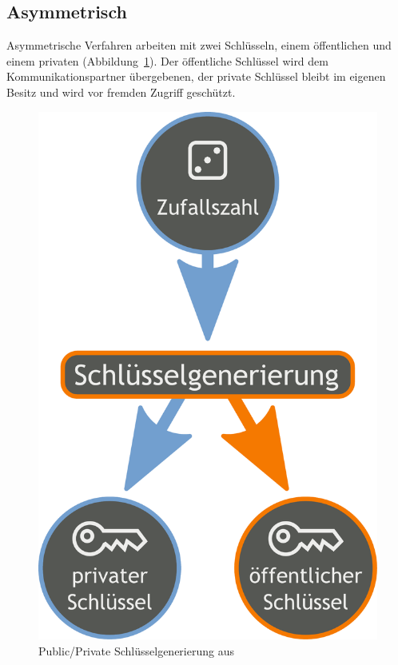 \documentclass[11pt,a4paper]{report}
\begin{document}
\subsection{Asymmetrisch} \label{sec:auth_asym}

Asymmetrische Verfahren arbeiten mit zwei Schlüsseln, einem öffentlichen und einem privaten (Abbildung~\ref{fig:pp_keygen}). Der öffentliche Schlüssel wird dem Kommunikationspartner übergebenen, der private Schlüssel bleibt im eigenen Besitz und wird vor fremden Zugriff geschützt. 

\begin{figure}[htbp]
\centering
\includegraphics[scale=0.2]{images/public_private_keygeneration.pdf}
\caption{Public/Private Schlüsselgenerierung aus \cite{wiki_asym_crypto}}
\label{fig:pp_keygen}
\end{figure}
\end{document}
